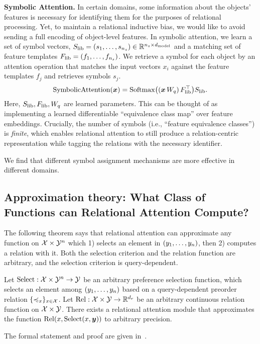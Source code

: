 \textbf{Symbolic Attention.} In certain domains, some information about the objects' features is necessary for identifying them for the purposes of relational processing. Yet, to maintain a relational inductive bias, we would like to avoid sending a full encoding of object-level features. In symbolic attention, we learn a set of symbol vectors, $S_\mathrm{lib} = (s_1, \ldots, s_{n_s}) \in \mathbb{R}^{n_s \times d_{\mathrm{model}}}$ and a matching set of feature templates $F_\mathrm{lib} = (f_1, \ldots, f_{n_s})$. We retrieve a symbol for each object by an attention operation that matches the input vectors $x_i$ against the feature templates $f_j$ and retrieves symbols $s_j$.
\begin{equation}
  \mathrm{SymbolicAttention}(\bm{x}) = \mathrm{Softmax}\big((\bm{x} \, W_q)\, F_\mathrm{lib}^\top\big) S_\mathrm{lib}.
\end{equation}
Here, $S_\mathrm{lib}, F_\mathrm{lib}, W_q$ are learned parameters. This can be thought of as implementing a learned differentiable ``equivalence class map'' over feature embeddings. Crucially, the number of symbols (i.e., ``feature equivalence classes'') is \textit{finite}, which enables relational attention to still produce a relation-centric representation while tagging the relations with the necessary identifier.

We find that different symbol assignment mechanisms are more effective in different domains.

\subsection{Approximation theory: What Class of Functions can Relational Attention Compute?}\label{ssec:approx}

The following theorem says that relational attention can approximate any function on ${\mathcal{X}} \times {\mathcal{Y}}^n$ which 1) selects an element in $(y_1, \ldots, y_n)$, then 2) computes a relation with it. Both the selection criterion and the relation function are arbitrary, and the selection criterion is query-dependent.
\begin{theorem}[Informal]\label{theorem:func_class}
  Let $\mathrm{Select}: {\mathcal{X}} \times {\mathcal{Y}}^n \to {\mathcal{Y}}$ be an arbitrary preference selection function, which selects an element among $(y_1, \ldots, y_n)$ based on a query-dependent preorder relation $\{\preccurlyeq_x\}_{x \in {\mathcal{X}}}$. Let $\mathrm{Rel}: {\mathcal{X}} \times {\mathcal{Y}} \to \mathbb{R}^{d_r}$ be an arbitrary continuous relation function on ${\mathcal{X}} \times {\mathcal{Y}}$. There exists a relational attention module that approximates the function $\mathrm{Rel}(x, \mathrm{Select}(x, \bm{y}))$ to arbitrary precision.
\end{theorem}
The formal statement and proof are given in~.